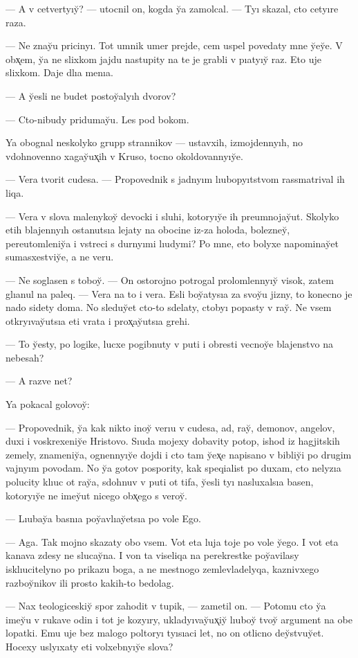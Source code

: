 \documentclass[10pt]{book}
\begin{document}
— A v cetvertyıy̆? — utocnil on, kogda y̆a zamolcal. — Tyı skazal, cto cetyıre raza.

— Ne znay̆u pricinyı. Tot umnik umer prejde, cem uspel povedaty mne y̆ey̆e. V obx̨em, y̆a ne slixkom jajdu nastupity na te je grabli v pıatyıy̆ raz. Eto uje slixkom. Daje dlıa menıa.

— A y̆esli ne budet postoy̆alyıh dvorov?

— Cto-nibudy pridumay̆u. Les pod bokom.

Ya obognal neskolyko grupp strannikov — ustavxih, izmojdennyıh, no vdohnovenno xagay̆ux̨ih v Kruso, tocno okoldovannyıy̆e.

— Vera tvorit cudesa. — Propovednik s jadnyım lıubopyıtstvom rassmatrival ih liqa.

— Vera v slova malenykoy̆ devocki i sluhi, kotoryıy̆e ih preumnojay̆ut. Skolyko etih blajennyıh ostanutsıa lejaty na obocine iz-za holoda, bolezney̆, pereutomleniy̆a i vstreci s durnyımi lıudymi? Po mne, eto bolyxe napominay̆et sumasxestviy̆e, a ne veru.

— Ne soglasen s toboy̆. — On ostorojno potrogal prolomlennyıy̆ visok, zatem glıanul na paleq. — Vera na to i vera. Esli boy̆atysıa za svoy̆u jizny, to konecno je nado sidety doma. No sleduy̆et cto-to sdelaty, ctobyı popasty v ray̆. Ne vsem otkryıvay̆utsıa eti vrata i prox̨ay̆utsıa grehi.

— To y̆esty, po logike, lucxe pogibnuty v puti i obresti vecnoy̆e blajenstvo na nebesah?

— A razve net?

Ya pokacal golovoy̆:

— Propovednik, y̆a kak nikto inoy̆ verıu v cudesa, ad, ray̆, demonov, angelov, duxi i voskrexeniy̆e Hristovo. Sıuda mojexy dobavity potop, ishod iz hagjitskih zemely, znameniy̆a, ognennyıy̆e dojdi i cto tam y̆ex̨e napisano v bibliy̆i po drugim vajnyım povodam. No y̆a gotov pospority, kak speqialist po duxam, cto nelyzıa polucity klıuc ot ray̆a, sdohnuv v puti ot tifa, y̆esli tyı nasluxalsıa basen, kotoryıy̆e ne imey̆ut nicego obx̨ego s veroy̆.

— Lıubay̆a basnıa poy̆avlıay̆etsıa po vole Ego.

— Aga. Tak mojno skazaty obo vsem. Vot eta luja toje po vole y̆ego. I vot eta kanava zdesy ne slucay̆na. I von ta viseliqa na perekrestke poy̆avilasy isklıucitelyno po prikazu boga, a ne mestnogo zemlevladelyqa, kaznivxego razboy̆nikov ili prosto kakih-to bedolag.

— Nax teologiceskiy̆ spor zahodit v tupik, — zametil on. — Potomu cto y̆a imey̆u v rukave odin i tot je kozyıry, ukladyıvay̆ux̨iy̆ lıuboy̆ tvoy̆ argument na obe lopatki. Emu uje bez malogo poltoryı tyısıaci let, no on otlicno dey̆stvuy̆et. Hocexy uslyıxaty eti volxebnyıy̆e slova?
\end{document}
